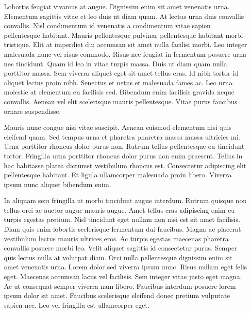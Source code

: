 \documentclass[
]{scrbook}
\begin{document}
Lobortis feugiat vivamus at augue. Dignissim enim sit amet venenatis urna. Elementum sagittis vitae et leo duis ut diam quam. At lectus urna duis convallis convallis. Nisl condimentum id venenatis a condimentum vitae sapien pellentesque habitant. Mauris pellentesque pulvinar pellentesque habitant morbi tristique. Elit at imperdiet dui accumsan sit amet nulla facilisi morbi. Leo integer malesuada nunc vel risus commodo. Risus nec feugiat in fermentum posuere urna nec tincidunt. Quam id leo in vitae turpis massa. Duis ut diam quam nulla porttitor massa. Sem viverra aliquet eget sit amet tellus cras. Id nibh tortor id aliquet lectus proin nibh. Senectus et netus et malesuada fames ac. Leo urna molestie at elementum eu facilisis sed. Bibendum enim facilisis gravida neque convallis. Aenean vel elit scelerisque mauris pellentesque. Vitae purus faucibus ornare suspendisse.

Mauris nunc congue nisi vitae suscipit. Aenean euismod elementum nisi quis eleifend quam. Sed tempus urna et pharetra pharetra massa massa ultricies mi. Urna porttitor rhoncus dolor purus non. Rutrum tellus pellentesque eu tincidunt tortor. Fringilla urna porttitor rhoncus dolor purus non enim praesent. Tellus in hac habitasse platea dictumst vestibulum rhoncus est. Consectetur adipiscing elit pellentesque habitant. Et ligula ullamcorper malesuada proin libero. Viverra ipsum nunc aliquet bibendum enim.

In aliquam sem fringilla ut morbi tincidunt augue interdum. Rutrum quisque non tellus orci ac auctor augue mauris augue. Amet tellus cras adipiscing enim eu turpis egestas pretium. Nisl tincidunt eget nullam non nisi est sit amet facilisis. Diam quis enim lobortis scelerisque fermentum dui faucibus. Magna ac placerat vestibulum lectus mauris ultrices eros. Ac turpis egestas maecenas pharetra convallis posuere morbi leo. Velit aliquet sagittis id consectetur purus. Semper quis lectus nulla at volutpat diam. Orci nulla pellentesque dignissim enim sit amet venenatis urna. Lorem dolor sed viverra ipsum nunc. Risus nullam eget felis eget. Maecenas accumsan lacus vel facilisis. Sem integer vitae justo eget magna. Ac ut consequat semper viverra nam libero. Faucibus interdum posuere lorem ipsum dolor sit amet. Faucibus scelerisque eleifend donec pretium vulputate sapien nec. Leo vel fringilla est ullamcorper eget.
\end{document}

